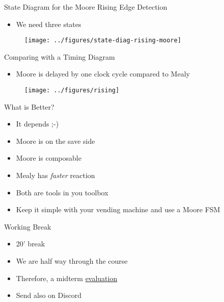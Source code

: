 \begin{frame}[fragile]{State Diagram for the Moore Rising Edge Detection}
\begin{itemize}
\item We need three states
\end{itemize}
\begin{figure}
  \texttt{[image: ../figures/state-diag-rising-moore]}
\end{figure}
\end{frame}

\begin{frame}[fragile]{Comparing with a Timing Diagram}
\begin{itemize}
\item Moore is delayed by one clock cycle compared to Mealy
\end{itemize}
\begin{figure}
  \texttt{[image: ../figures/rising]}
\end{figure}
\end{frame}

\begin{frame}[fragile]{What is Better?}
\begin{itemize}
\item It depends ;-)
\item Moore is on the save side
\item Moore is composable
\item Mealy has \emph{faster} reaction
\item Both are tools in you toolbox
\item Keep it simple with your vending machine and use a Moore FSM
\end{itemize}
\end{frame}

\begin{frame}[fragile]{Working Break}
\begin{itemize}
\item 20' break
\item We are half way through the course
\item Therefore, a midterm \href{https://docs.google.com/forms/d/e/1FAIpQLSdoxImx6YXhj8-bRZAdA894BWM9xwBwvCskeXwMdXP9-xk5qA/viewform?usp=header}{evaluation}
\item Send also on Discord
\end{itemize}
\end{frame}

